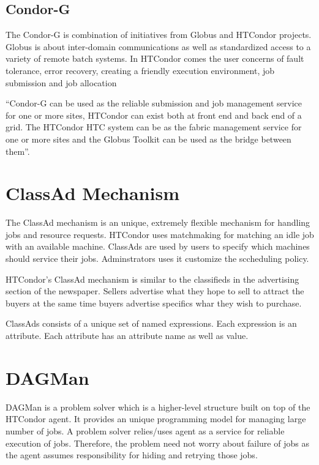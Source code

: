 \documentclass[9pt,twocolumn,twoside]{styles/osajnl}
\begin{document}
\subsection{Condor-G}

The Condor-G is combination of initiatives from Globus and HTCondor
projects. Globus is about inter-domain communications as well as
standardized access to a variety of remote batch
systems\cite{Globus1997article}. In HTCondor comes the user concerns
of fault tolerance, error recovery, creating a friendly execution
environment, job submission and job allocation

``Condor-G can be used as the reliable submission and job management
service for one or more sites, HTCondor can exist both at front end
and back end of a grid. The HTCondor HTC system can be as the fabric
management service for one or more sites and the Globus Toolkit can be
used as the bridge between them''\cite{condor-practice}.

\section{ClassAd Mechanism}
The ClassAd mechanism is an unique, extremely flexible mechanism for
handling jobs and resource requests. HTCondor uses matchmaking for
matching an idle job with an available machine. ClassAds are used by
users to specify which machines should service their
jobs. Adminstrators uses it customize the sccheduling policy.

HTCondor's ClassAd mechanism is similar to the classifieds in the
advertising section of the newspaper. Sellers advertise what they hope
to sell to attract the buyers at the same time buyers advertise
specifics whar they wish to purchase.

ClassAds consists of a unique set of named expressions. Each
expression is an attribute. Each attribute has an attribute name as
well as value\cite{ClassAddstechreport2003}.

\section{DAGMan}
DAGMan is a problem solver which is a higher-level structure built on
top of the HTCondor agent. It provides an unique programming model for
managing large number of jobs. A problem solver relies/uses agent as a
service for reliable execution of jobs. Therefore, the problem need
not worry about failure of jobs as the agent assumes responsibility
for hiding and retrying those jobs.
\end{document}
